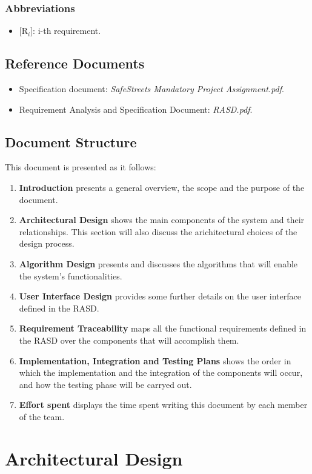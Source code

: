 \documentclass{report}
\begin{document}
\subsection{Abbreviations}
\begin{itemize}
    \item {[R$_{i}$]}: i-th requirement.
    \end{itemize}
\section{Reference Documents}
\begin{itemize}
    \item Specification document: \textit{SafeStreets Mandatory Project Assignment.pdf}.
    \item Requirement Analysis and Specification Document: \textit{RASD.pdf}.
\end{itemize}
\section{Document Structure}
This document is presented as it follows:
\begin{enumerate}
    \item \textbf{Introduction} presents a general overview, the scope and the purpose of the document.
    \item \textbf{Architectural Design} shows the main components of the system and their relationships. This section will also discuss the arichitectural choices of the design process.
    \item \textbf{Algorithm Design} presents and discusses the algorithms that will enable the system's functionalities.
    \item \textbf{User Interface Design} provides some further details on the user interface defined in the RASD.
    \item \textbf{Requirement Traceability} maps all the functional requirements defined in the RASD over the components that will accomplish them.
    \item \textbf{Implementation, Integration and Testing Plans} shows the order in which the implementation and the integration of the components will occur, and how the testing phase will be carryed out.
    \item {\textbf{Effort spent}} displays the time spent writing this document by each member of the team.
\end{enumerate}
\chapter{Architectural Design}
\end{document}
